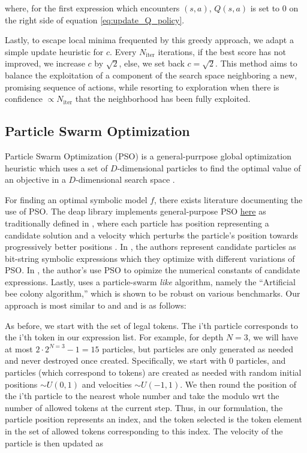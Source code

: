 \documentclass[12pt]{iopart}
\begin{document}
where, for the first expression which encounters $(s,a)$, $Q(s,a)$ is set to 0 on the right side of equation \ref{eq:update_Q_policy}. 
\par Lastly, to escape local minima frequented by this greedy approach, we adapt a simple update heuristic for $c$.  Every $N_{\mathrm{iter}}$ iterations, if the best score has not improved, we increase $c$ by $\sqrt{2}$, else, we set back $c = \sqrt{2}$. This method aims to balance the exploitation of a component of the search space neighboring a new, promising sequence of actions, while resorting to exploration when there is confidence $\propto N_{\mathrm{iter}}$ that the neighborhood has been fully exploited.

\subsection{Particle Swarm Optimization} \label{subsec:ParticleSwarmOptimization}
Particle Swarm Optimization (PSO) is a general-purrpose global optimization heuristic which uses a set of $D$-dimensional particles to find the optimal value of an objective in a $D$-dimensional search space \cite{clerc:hal-00764996}. 
\par For finding an optimal symbolic model $f$, there exists literature documenting the use of PSO. The deap library implements general-purpose PSO \href{https://github.com/DEAP/deap/blob/60913c5543abf8318ddce0492e8ffcdf37974d86/examples/pso/basic.py}{here} as traditionally defined in \cite{PoliOverviewPSO}, where each particle has position representing a candidate solution and a velocity which perturbs the particle's position towards progressively better positions \cite{DEAP_JMLR2012}. In \cite{10.1007/978-3-319-70093-9_37}, the authors represent candidate particles as bit-string symbolic expressions which they optimize with different variations of PSO. In \cite{Lu2021}, the author's use PSO to opimize the numerical constants of candidate expressions. Lastly, \cite{KARABOGA20121} uses a particle-swarm \emph{like} algorithm, namely the ``Artificial bee colony algorithm,'' which is shown to be robust on various benchmarks. Our approach is most similar to \cite{DEAP_JMLR2012} and \cite{10.1007/978-3-319-70093-9_37} and is as follows:
\par As before, we start with the set of legal tokens. The i'th particle corresponds to the i'th token in our expression list. For example, for depth $N = 3$, we will have at most $2\cdot 2^{N = 3} - 1 = 15$ particles, but particles are only generated as needed and never destroyed once created. Specifically, we start with 0 particles, and particles (which correspond to tokens) are created as needed with random initial positions $\sim U(0,1)$ and velocities $\sim U(-1,1)$. We then round the position of the i'th particle to the nearest whole number and take the modulo wrt the number of allowed tokens at the current step. Thus, in our formulation, the particle position represents an index, and the token selected is the token element in the set of allowed tokens corresponding to this index. The velocity of the particle is then updated as \cite{clerc:hal-00764996} \cite{offShellPSO}
\end{document}
